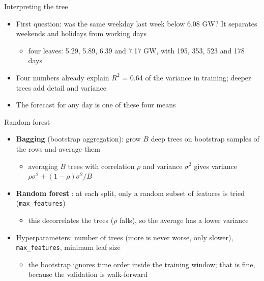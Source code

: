 \begin{frame}{Interpreting the tree}
\itemsize{\small}
\begin{itemize}
    \item First question: was the same weekday last week below 6.08 GW? It separates weekends and holidays from working days
    \begin{itemize}
        \item four leaves: 5.29, 5.89, 6.39 and 7.17 GW, with 195, 353, 523 and 178 days
    \end{itemize}
    \item Four numbers already explain $R^2$ = 0.64 of the variance in training; deeper trees add detail and variance
    \item The forecast for any day is one of these four means
\end{itemize}
\end{frame}

\begin{frame}{Random forest}
\itemsize{\small}
\begin{itemize}
    \item \textbf{Bagging} (bootstrap aggregation): grow $B$ deep trees on bootstrap samples of the rows and average them
    \begin{itemize}
        \item averaging $B$ trees with correlation $\rho$ and variance $\sigma^2$ gives variance $\rho\sigma^2 + (1 - \rho)\sigma^2/B$
    \end{itemize}
    \item \textbf{Random forest} : at each split, only a random subset of features is tried (\texttt{max\_features})
    \begin{itemize}
        \item this decorrelates the trees ($\rho$ falls), so the average has a lower variance
    \end{itemize}
    \item Hyperparameters: number of trees (more is never worse, only slower), \texttt{max\_features}, minimum leaf size
    \begin{itemize}
        \item the bootstrap ignores time order inside the training window; that is fine, because the validation is walk-forward
    \end{itemize}
\end{itemize}
\end{frame}


